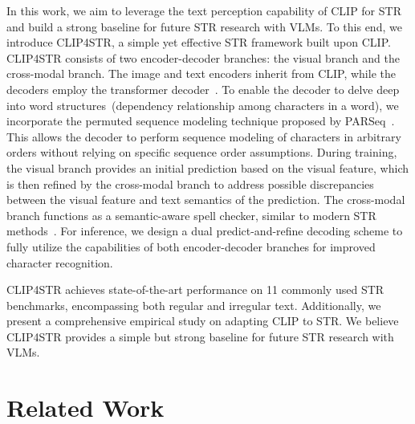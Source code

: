\documentclass[lettersize,journal]{IEEEtran}
\begin{document}
In this work, we aim to leverage the text perception capability of CLIP for STR and build a strong baseline for future STR research with VLMs.
To this end, we introduce CLIP4STR, a simple yet effective STR framework built upon CLIP.
CLIP4STR consists of two encoder-decoder branches: the visual branch and the cross-modal branch. 
The image and text encoders inherit from CLIP, while the decoders employ the transformer decoder~\cite{2017_attention}. 
To enable the decoder to delve deep into word structures~(dependency relationship among characters in a word), we incorporate the permuted sequence modeling technique proposed by PARSeq~\cite{2022_parseq}. 
This allows the decoder to perform sequence modeling of characters in arbitrary orders without relying on specific sequence order assumptions.
During training, the visual branch provides an initial prediction based on the visual feature, which is then refined by the cross-modal branch to address possible discrepancies between the visual feature and text semantics of the prediction.
The cross-modal branch functions as a semantic-aware spell checker, similar to modern STR methods~\cite{2021_abinet,li2021trocr}. 
For inference, we design a dual predict-and-refine decoding scheme to fully utilize the capabilities of both encoder-decoder branches for improved character recognition.


CLIP4STR achieves state-of-the-art performance on 11 commonly used STR benchmarks, encompassing both regular and irregular text.
Additionally, we present a comprehensive empirical study on adapting CLIP to STR.
We believe CLIP4STR provides a simple but strong baseline for future STR research with VLMs. 



 
\section{Related Work}
\end{document}
